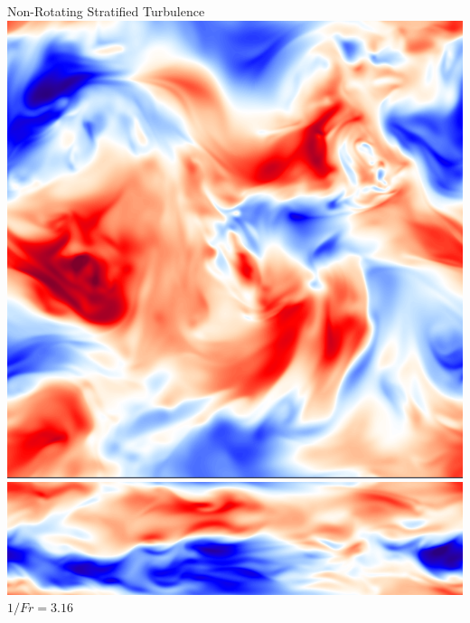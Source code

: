 \documentclass[aspecttatio=169]{beamer}
\begin{document}
\begin{frame}{Non-Rotating Stratified Turbulence}
        \includegraphics[width=\textwidth]{images/XYB10ux.png}
        \includegraphics[width=\textwidth]{images/XZB10ux.png}
        \vspace{2pt}
        $1/Fr = 3.16$
    \emp
    \hspace{1pt}
        \centering
        

\end{frame}
\end{document}
